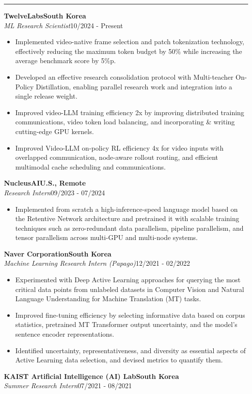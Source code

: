 \documentclass[10pt,a4paper]{article}
\newcommand{\sectiontitle}[1]{%
  \par\vspace{4pt}%
  \noindent{\bfseries\fontsize{10.3}{12}\selectfont #1}\par
  \vspace{1.5pt}\hrule\vspace{2pt}%
}
\newcommand{\job}[4]{\noindent\textbf{#1}\hfill\textbf{#2}\\[0.5pt]\textit{#3}\hfill #4\par\vspace{1pt}}
\begin{document}
\sectiontitle{PROFESSIONAL \& RESEARCH EXPERIENCE}
\job{TwelveLabs}{South Korea}{ML Research Scientist}{10/2024 - Present}
\begin{itemize}
  \item Implemented video-native frame selection and patch tokenization technology, effectively reducing the maximum token budget by 50\% while increasing the average benchmark score by 5\%p.
  \item Developed an effective research consolidation protocol with Multi-teacher On-Policy Distillation, enabling parallel research work and integration into a single release weight.
  \item Improved video-LLM training efficiency 2x by improving distributed training communications, video token load balancing, and incorporating \& writing cutting-edge GPU kernels.
  \item Improved Video-LLM on-policy RL efficiency 4x for video inputs with overlapped communication, node-aware rollout routing, and efficient multimodal cache scheduling and communications.
\end{itemize}
\job{NucleusAI}{U.S., Remote}{Research Intern}{09/2023 - 07/2024}
\begin{itemize}
  \item Implemented from scratch a high-inference-speed language model based on the Retentive Network architecture and pretrained it with scalable training techniques such as zero-redundant data parallelism, pipeline parallelism, and tensor parallelism across multi-GPU and multi-node systems.
\end{itemize}
\job{Naver Corporation}{South Korea}{Machine Learning Research Intern (Papago)}{12/2021 - 02/2022}
\begin{itemize}
  \item Experimented with Deep Active Learning approaches for querying the most critical data points from unlabeled datasets in Computer Vision and Natural Language Understanding for Machine Translation (MT) tasks.
  \item Improved fine-tuning efficiency by selecting informative data based on corpus statistics, pretrained MT Transformer output uncertainty, and the model's sentence encoder representations.
  \item Identified uncertainty, representativeness, and diversity as essential aspects of Active Learning data selection, and devised metrics to quantify them.
\end{itemize}
\job{KAIST Artificial Intelligence (AI) Lab}{South Korea}{Summer Research Intern}{07/2021 - 08/2021}
\end{document}
